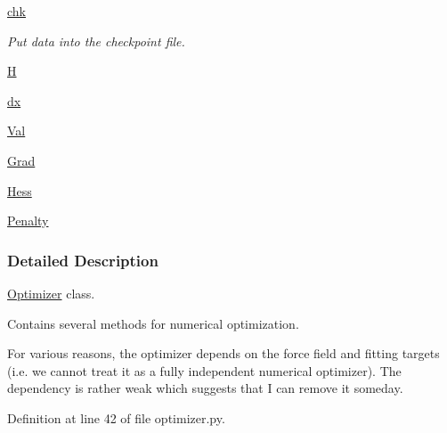 \begin{DoxyCompactItemize}
\hyperlink{classforcebalance_1_1optimizer_1_1Optimizer_aab04585adf73123d3187aa7dd22e7ce2}{chk}
\begin{DoxyCompactList}\small\item\em Put data into the checkpoint file. \end{DoxyCompactList}\item 
\hyperlink{classforcebalance_1_1optimizer_1_1Optimizer_a7cf404b3b15afec4237344f09a31b6c7}{H}
\item 
\hyperlink{classforcebalance_1_1optimizer_1_1Optimizer_aaa9b39385a4d067aec12a595da09cc16}{dx}
\item 
\hyperlink{classforcebalance_1_1optimizer_1_1Optimizer_a2577b97a9ee5f3fcd4aa108a2baafc04}{Val}
\item 
\hyperlink{classforcebalance_1_1optimizer_1_1Optimizer_a91fbca8385133fa434eae3078e217fb6}{Grad}
\item 
\hyperlink{classforcebalance_1_1optimizer_1_1Optimizer_ab99276420d1c28932d2559c7f8e88922}{Hess}
\item 
\hyperlink{classforcebalance_1_1optimizer_1_1Optimizer_a5dc01aec7e22062a42cc83298c49cadd}{Penalty}
\end{DoxyCompactItemize}


\subsubsection{Detailed Description}
\hyperlink{classforcebalance_1_1optimizer_1_1Optimizer}{Optimizer} class. 

Contains several methods for numerical optimization.

For various reasons, the optimizer depends on the force field and fitting targets (i.\-e. we cannot treat it as a fully independent numerical optimizer). The dependency is rather weak which suggests that I can remove it someday. 

Definition at line 42 of file optimizer.\-py.




